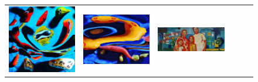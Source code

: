 \begin{figure}
\begin{minipage}[t]{\textwidth}
\begin{tabular}{m{.01\linewidth} m{.16\linewidth} m{.16\linewidth} m{.16\linewidth} m{.16\linewidth} m{.16\linewidth}}
    \includegraphics[width=\linewidth]{../style/figures/flickr_on_flickr/pred_style_Bright/0.jpg} &
    \includegraphics[width=\linewidth]{../style/figures/flickr_on_flickr/pred_style_Bright/1.jpg} &
    \includegraphics[width=\linewidth]{../style/figures/flickr_on_flickr/pred_style_Bright/2.jpg} &

\end{tabular}
\end{minipage}
\end{figure}
